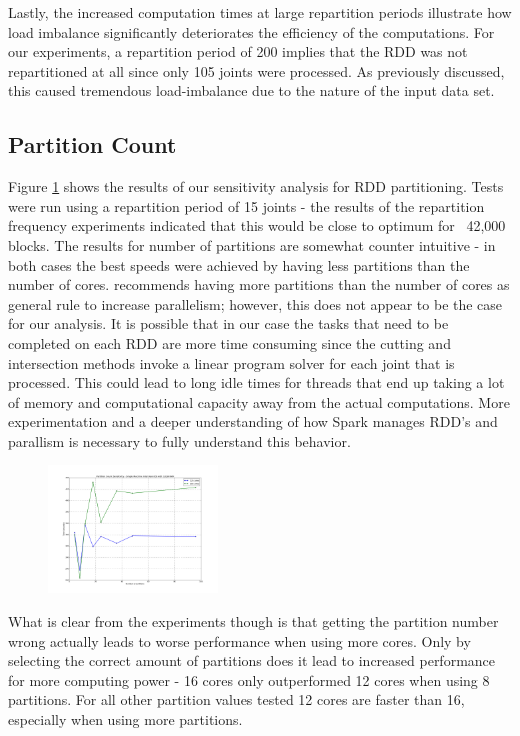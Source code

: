 Lastly, the increased computation times at large repartition periods illustrate how load imbalance significantly deteriorates the efficiency of the computations. For our experiments, a repartition period of 200 implies that the RDD was not repartitioned at all since only 105 joints were processed. As previously discussed, this caused tremendous load-imbalance due to the nature of the input data set. \par

\subsection{Partition Count}
Figure \ref{fig:PartCount} shows the results of our sensitivity analysis for RDD partitioning. Tests were run using a repartition period of 15 joints - the results of the repartition frequency experiments indicated that this would be close to optimum for ~42,000 blocks. The results for number of partitions are somewhat counter intuitive - in both cases the best speeds were achieved by having less partitions than the number of cores. \cite{sparkTuning} recommends having more partitions than the number of cores as general rule to increase parallelism; however, this does not appear to be the case for our analysis. It is possible that in our case the tasks that need to be completed on each RDD are more time consuming since the cutting and intersection methods invoke a linear program solver for each joint that is processed. This could lead to long idle times for threads that end up taking a lot of memory and computational capacity away from the actual computations. More experimentation and a deeper understanding of how Spark manages RDD's and parallism is necessary to fully understand this behavior. \par

\begin{figure}
  \centering
  \includegraphics[width=0.4\textwidth]{PartCount} 
  \label{fig:PartCount}           
\end{figure}

What is clear from the experiments though is that getting the partition number wrong actually leads to worse performance when using more cores. Only by selecting the correct amount of partitions does it lead to increased performance for more computing power - 16 cores only outperformed 12 cores when using 8 partitions. For all other partition values tested 12 cores are faster than 16, especially when using more partitions.

